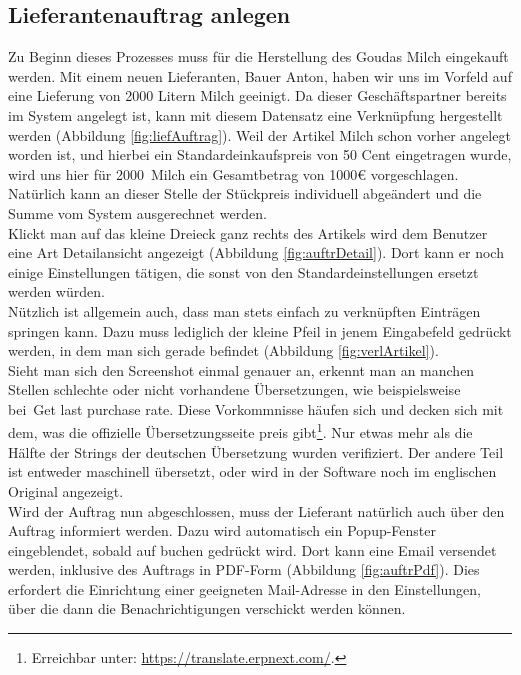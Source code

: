\subsection{Lieferantenauftrag anlegen}
Zu Beginn dieses Prozesses muss für die Herstellung des Goudas Milch eingekauft werden. Mit einem neuen Lieferanten, Bauer Anton, haben wir uns im Vorfeld auf eine Lieferung von 2000 Litern Milch geeinigt. Da dieser Geschäftspartner bereits im System angelegt ist, kann mit diesem Datensatz eine Verknüpfung hergestellt werden (\vgl Abbildung \ref{fig:liefAuftrag}). Weil der Artikel Milch schon vorher angelegt worden ist, und hierbei ein Standardeinkaufspreis von 50 Cent eingetragen wurde, wird uns hier für 2000\ell\ Milch ein Gesamtbetrag von 1000€ vorgeschlagen. Natürlich kann an dieser Stelle der Stückpreis individuell abgeändert und die Summe vom System ausgerechnet werden. \\
Klickt man auf das kleine Dreieck ganz rechts des Artikels wird dem Benutzer eine Art Detailansicht angezeigt (\vgl Abbildung \ref{fig:auftrDetail}). Dort kann er noch einige Einstellungen tätigen, die sonst von den Standardeinstellungen ersetzt werden würden. \\
Nützlich ist allgemein auch, dass man stets einfach zu verknüpften Einträgen springen kann. Dazu muss lediglich der kleine Pfeil in jenem Eingabefeld gedrückt werden, in dem man sich gerade befindet (\vgl Abbildung \ref{fig:verlArtikel}).\\
Sieht man sich den Screenshot einmal genauer an, erkennt man an manchen Stellen schlechte oder nicht vorhandene Übersetzungen, wie beispielsweise bei\ \glqq Get last purchase rate\grqq. Diese Vorkommnisse häufen sich und decken sich mit dem, was die offizielle Übersetzungsseite preis gibt\footnote{Erreichbar unter: \url{https://translate.erpnext.com/}.}. Nur etwas mehr als die Hälfte der Strings der deutschen Übersetzung wurden verifiziert. Der andere Teil ist entweder maschinell übersetzt, oder wird in der Software noch im englischen Original angezeigt. \\
Wird der Auftrag nun abgeschlossen, muss der Lieferant natürlich auch über den Auftrag informiert werden. Dazu wird automatisch ein Popup-Fenster eingeblendet, sobald auf buchen gedrückt wird. Dort kann eine Email versendet werden, inklusive des Auftrags in PDF-Form (\vgl Abbildung \ref{fig:auftrPdf}). Dies erfordert die Einrichtung einer geeigneten Mail-Adresse in den Einstellungen, über die dann die Benachrichtigungen verschickt werden können.

